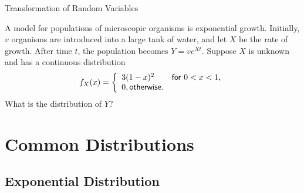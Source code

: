 \begin{frame}{Transformation of Random Variables}

\justifying
{} A model for populations of microscopic organisms is exponential growth. Initially, $v$ organisms are introduced into a large tank of water, and let $X$ be the rate of growth. After time $t$, the population becomes $Y = ve^{Xt}$. Suppose $X$ is unknown and has a continuous distribution
\begin{align*}
f_X(x) = \left\{
\begin{array}{ll}
3(1-x)^2 & \mathsf{for\ } 0 < x < 1, \\
0, \mathsf{otherwise}.
\end{array}
\right.
\end{align*}
What is the distribution of $Y$? \\


\end{frame}


\section{Common Distributions}

\subsection{Exponential Distribution}

